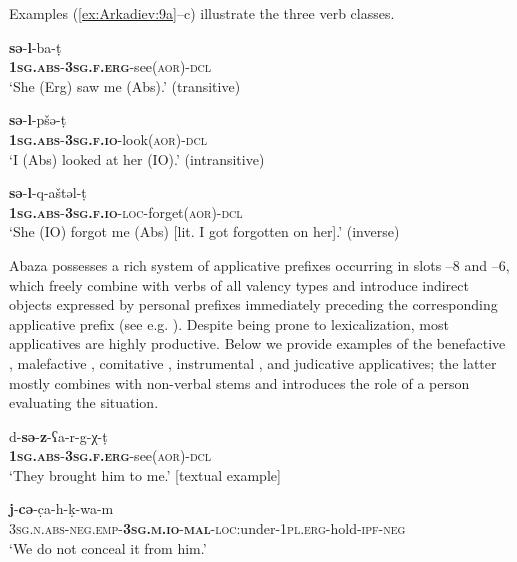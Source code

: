 \documentclass[output=paper]{langscibook}
\begin{document}
Examples (\ref{ex:Arkadiev:9a}--c) illustrate the three verb classes.

\ea 
\label{ex:Arkadiev:9}
    \ea 
    \label{ex:Arkadiev:9a}
    \gll \textbf{{s{ə}}}{{}-}\textbf{{l}}{{}-ba-t{̣}}\\
     \textbf{\textsc{1sg.abs}}\textsc{{}-}\textbf{\textsc{3sg.f.erg}}{}-see(\textsc{aor)-dcl}\\
    \glt  ‘She (Erg) saw me (Abs).’ (transitive)
    
    \ex 
    \label{ex:Arkadiev:9b}
    \gll  \textbf{{s{ə}}}{{}-}\textbf{{l}}{{}-pš{ə}-t{̣}}\\
    \textbf{\textsc{1sg.abs}}\textsc{{}-}\textbf{\textsc{3sg.f.io}}{}-look(\textsc{aor)-dcl}\\
    \glt ‘I (Abs) looked at her (IO).’ (intransitive)
    
    \ex 
    \label{ex:Arkadiev:9c}
    \gll  \textbf{{s{ə}}}{{}-}\textbf{{l}}{{}-q-ašt{ə}l-t{̣}}\\
   \textbf{\textsc{1sg.abs}}\textsc{{}-}\textbf{\textsc{3sg.f.io}}\textsc{{}-loc}{}-forget(\textsc{aor)-dcl}\\
    \glt ‘She (IO) forgot me (Abs) [lit. I got forgotten on her].’ (inverse)
    \z
\z
    



Abaza possesses a rich system of applicative prefixes occurring in slots –8 and –6, which freely combine with verbs of all valency types and introduce indirect objects expressed by personal prefixes immediately preceding the corresponding applicative prefix (see e.g. \citealt{OHerin2001}). Despite being prone to lexicalization, most applicatives are highly productive. Below we provide examples of the benefactive , malefactive , comitative , instrumental , and judicative  applicatives; the latter mostly combines with non-verbal stems and introduces the role of a person evaluating the situation.


\ea 
\label{ex:Arkadiev:10}
    \ea 
    \label{ex:Arkadiev:10a}
    \gll  d-\textbf{s{ə}}-\textbf{{z}}{{}-{ʕ}a-r-g-χ-t{̣}}\\
     \textbf{\textsc{1sg.abs}}\textsc{{}-}\textbf{\textsc{3sg.f.erg}}{}-see(\textsc{aor)-dcl}\\
     \glt ‘They brought him to me.’ [textual example]
    
    \ex 
    \label{ex:Arkadiev:10b}
    \textbf{{j}}{{}-}\textbf{{c{ə}}}{{}-c{̣}a-h-k{̣}-wa-m}\\
    \textsc{3sg.n.abs-neg.emp-}\textbf{\textsc{3sg.m.io}}\textsc{{}-}\textbf{\textsc{mal}}\textsc{{}-loc}:under-\textsc{1pl.erg}{}-hold-\textsc{ipf-neg}\\
    \glt  ‘We do not conceal it from him.’ \citep[184]{Tabulova1976}
    
\end{document}
